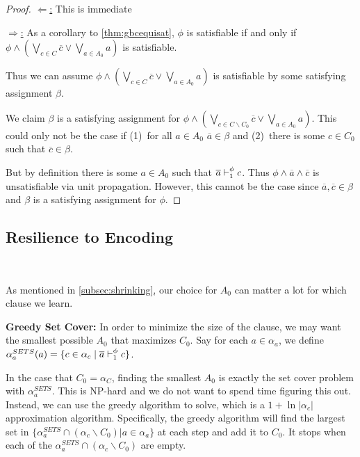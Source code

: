 \begin{proof}
    \underline{$\Leftarrow$:} This is immediate


    \underline{$\Rightarrow$:}  As a corollary to \autoref{thm:gbcequisat}, $\phi$ is satisfiable if and only if $\phi \land (\bigvee_{c \in C} \overline{c} \lor \bigvee_{a \in A_0} a)$ is satisfiable.

    Thus we can assume $\phi \land (\bigvee_{c \in C} \overline{c} \lor \bigvee_{a \in A_0} a)$ is satisfiable by some satisfying assignment $\beta$.

    We claim $\beta$ is a satisfying assignment for $\phi \land (\bigvee_{c \in C \backslash C_0} \overline{c} \lor \bigvee_{a \in A_0} a)$. This could only not be the case if (1)~for all $a \in A_0$ $\overline{a} \in \beta$ and (2)~there is some $c \in C_0$ such that $\overline{c} \in \beta$. 

    But by definition there is some $a \in A_0$ such that $\overline{a} \vdash_1^\phi c$. Thus $\phi \land \overline{a} \land \overline{c}$ is unsatisfiable via unit propagation. However, this cannot be the case since $\overline{a}, \overline{c} \in \beta$ and $\beta$ is a satisfying assignment for $\phi$.
\end{proof}

\subsection{Resilience to Encoding}~\label{subsec:sym}

As mentioned in \autoref{subsec:shrinking}, our choice for $A_0$ can matter a lot for which clause we learn. 


\noindent \textbf{Greedy Set Cover:} %
In order to minimize the size of the clause, we may want the smallest possible $A_0$ that maximizes $C_0$. Say for each $a \in \alpha_a$, we define $\alpha_a^{SETS}(a) = \{ c \in \alpha_c \; | \; \overline{a} \vdash_1^\phi c\}$. 

In the case that $C_0 = \alpha_C$, finding the smallest $A_0$ is exactly the set cover problem with $\alpha_a^{SETS}$. This is NP-hard and we do not want to spend time figuring this out. Instead, we can use the greedy algorithm to solve, which is a $1 + \ln |\alpha_c|$ approximation algorithm. Specifically, the greedy algorithm will find the largest set in $\{\alpha_a^{SETS} \cap (\alpha_c \backslash C_0) | a \in \alpha_a \}$ at each step and add it to $C_0$. It stops when each of the $\alpha_a^{SETS} \cap (\alpha_c \backslash C_0)$ are empty.


